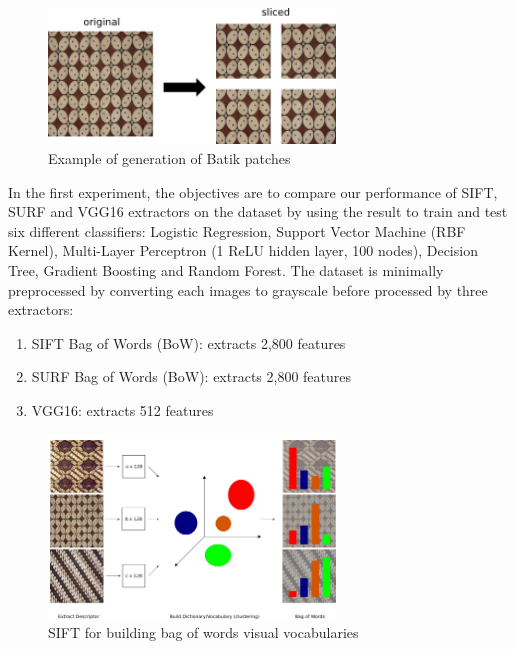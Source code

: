 \documentclass[conference, compsoc]{IEEEtran}
\begin{document}
\begin{figure}[h]
	\begin{center}
		\includegraphics[width=3.0in]{../dataset}
		\renewcommand{\figurename}{Fig.}
		\caption{Example of generation of Batik patches}
		\label{fig_dateset}
	\end{center}
\end{figure}


In the first experiment, the objectives are to compare our performance of SIFT, SURF and VGG16 extractors on the dataset by using the result to train and test six different classifiers: Logistic Regression, Support Vector Machine (RBF Kernel), Multi-Layer Perceptron (1 ReLU hidden layer, 100 nodes), Decision Tree, Gradient Boosting and Random Forest. The dataset is minimally preprocessed by converting each images to grayscale before processed by three extractors:

\begin{enumerate}
\item SIFT Bag of Words (BoW): extracts 2,800 features
\item SURF Bag of Words (BoW): extracts 2,800 features
\item VGG16: extracts 512 features
\end{enumerate}

%
%

\begin{figure}[h]
	\begin{center}
		\includegraphics[width=3.0in]{../sift-bag-of-words}
		\renewcommand{\figurename}{Fig.}	
		\caption{SIFT for building bag of words visual vocabularies}
		\label{fig_sift_bag_of_words}
	\end{center}
\end{figure}
\end{document}
